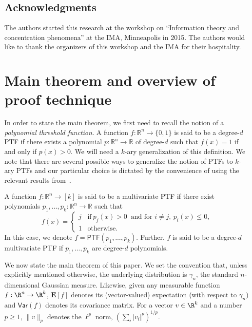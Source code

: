 \documentclass{toc}
\begin{document}
\subsection{Acknowledgments} 
The authors started this research at the workshop on ``Information theory and concentration phenomena'' at the IMA, Minneapolis in 2015. The authors would like to thank the organizers of this workshop and the IMA for their hospitality. 

\section{Main theorem and overview of proof technique} \label{sec:theorem}
In order to state the main theorem, we first need to recall the notion of a
\emph{polynomial threshold function.} %
A function  $f: \mathbb{R}^n \rightarrow \{0,1\}$ is said to be a degree-$d$ PTF if there exists a polynomial $p: \mathbb{R}^n \rightarrow \mathbb{R}$ of degree-$d$ such that $f(x) = 1$ if and only if $p(x) > 0$. We will need a $k$-ary generalization of this definition. We note that there are several possible ways to generalize the notion of PTFs to $k$-ary PTFs and our particular choice is dictated by the convenience of using the relevant results from~\cite{DS14}. 

\begin{definition}
A function $f: \mathbb{R}^n \rightarrow [k]$ is said to be a multivariate PTF
if there exist polynomials $p_1, \ldots, p_k : \mathbb{R}^n \rightarrow
\mathbb{R}$ such that 
$$
f(x) = \begin{cases}
j  & \textrm{if} \  p_j(x)>0 \ \textrm{ and  for } i \neq j, \  p_{i}(x) \le 0, \\
1 & \textrm{otherwise.}\end{cases}
$$
In this case, we denote $f = \mathsf{PTF}(p_1, \ldots, p_k)$. Further, $f$ is said to be a degree-$d$ multivariate PTF if   $p_1, \ldots, p_k$ are  degree-$d$ polynomials.
\end{definition}
We now state the main theorem of this paper. We set the convention that, unless
explicitly mentioned otherwise, the underlying distribution is $\gamma_n$, the
standard $n$-dimensional Gaussian measure. 
Likewise, given any measurable function $f: \R^n \to \R^k$, $\mathbf{E}[f]$ denotes its (vector-valued) expectation (with respect to $\gamma_n$) and $\mathsf{Var}(f)$ denotes its covariance matrix.  
For a vector $v \in \R^k$ and a number $p \ge 1$, $\|v\|_p$ denotes the
$\ell^p$ norm, $(\sum_i |v_i|^p)^{1/p}$.
\end{document}
